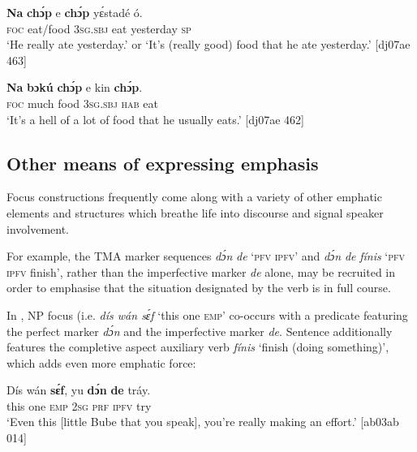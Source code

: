 \ea%
    \label{ex:key:740}
    \gll \textbf{Na}  \textbf{chɔ́p}    e    \textbf{chɔ́p}  yɛ́stadé    ó.\\
\textsc{foc}  eat/food    \textsc{3sg.sbj}  eat    yesterday  \textsc{sp}\\

\glt ‘He really ate yesterday.’ or ‘It’s (really good) food that he ate yesterday.’ [dj07ae 463]
\z


\ea%
    \label{ex:key:741}
    \gll \textbf{Na}  \textbf{bɔkú}  \textbf{chɔ́p}  e    kin  \textbf{chɔ́p}.\\
\textsc{foc}  much  food    \textsc{3sg.sbj}  \textsc{hab}  eat\\

\glt ‘It’s a hell of a lot of food that he usually eats.’ [dj07ae 462]
\z

\subsection{Other means of expressing emphasis}

Focus constructions frequently come along with a variety of other emphatic elements and structures which breathe life into discourse and signal speaker involvement. 


For example, the TMA marker sequences \textit{dɔ́n} \textit{de} ‘\textsc{pfv} \textsc{ipfv}’ and \textit{dɔ́n} \textit{de} \textit{fínis} ‘\textsc{pfv} \textsc{ipfv} finish’, rather than the imperfective marker \textit{de} alone, may be recruited in order to emphasise that the situation designated by the verb is in full course. 



In , NP focus (i.e. \textit{dís wán sɛ́f} ‘this one \textsc{emp}’ co-occurs with a predicate featuring the perfect marker \textit{dɔ́n} and the imperfective marker \textit{de}. Sentence  additionally features the completive aspect{\fff} auxiliary verb \textit{fínis} ‘finish (doing something)’, which adds even more emphatic force: 



\ea%
    \label{ex:key:742}
    \gll Dís  wán    \textbf{sɛ́f},  yu  \textbf{dɔ́n}  \textbf{de}  tráy.\\
this  one    \textsc{emp}  \textsc{2sg}  \textsc{prf}  \textsc{ipfv}  try\\

\glt ‘Even this [little Bube that you speak], you’re really making an effort.’ [ab03ab 014]
\z


